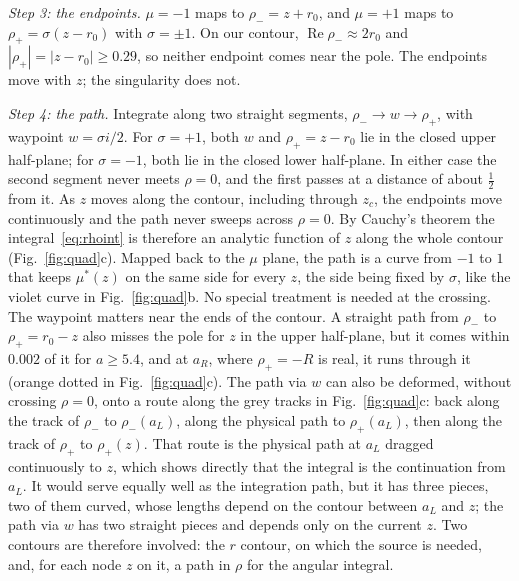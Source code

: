 \documentclass[aps,prd,twocolumn,superscriptaddress,nofootinbib,floatfix]{revtex4-2}
\renewcommand{\Re}{\operatorname{Re}}
\begin{document}
\emph{Step 3: the endpoints.}
$\mu=-1$ maps to $\rho_-=z+r_0$, and $\mu=+1$ maps to $\rho_+=\sigma(z-r_0)$ with $\sigma=\pm1$.
On our contour, $\Re\rho_-\approx2r_0$ and $|\rho_+|=|z-r_0|\ge0.29$, so neither endpoint comes near the pole.
The endpoints move with $z$; the singularity does not.

\emph{Step 4: the path.}
Integrate along two straight segments, $\rho_-\to w\to\rho_+$, with waypoint $w=\sigma i/2$.
For $\sigma=+1$, both $w$ and $\rho_+=z-r_0$ lie in the closed upper half-plane; for $\sigma=-1$, both lie in the closed lower half-plane.
In either case the second segment never meets $\rho=0$, and the first passes at a distance of about $\tfrac12$ from it.
As $z$ moves along the contour, including through $z_c$, the endpoints move continuously and the path never sweeps across $\rho=0$.
By Cauchy's theorem the integral~\eqref{eq:rhoint} is therefore an analytic function of $z$ along the whole contour (Fig.~\ref{fig:quad}c).
Mapped back to the $\mu$ plane, the path is a curve from $-1$ to $1$ that keeps $\mu^*(z)$ on the same side for every $z$, the side being fixed by $\sigma$, like the violet curve in Fig.~\ref{fig:quad}b.
No special treatment is needed at the crossing.
The waypoint matters near the ends of the contour.
A straight path from $\rho_-$ to $\rho_+=r_0-z$ also misses the pole for $z$ in the upper half-plane, but it comes within $0.002$ of it for $a\ge5.4$, and at $a_R$, where $\rho_+=-R$ is real, it runs through it (orange dotted in Fig.~\ref{fig:quad}c).
The path via $w$ can also be deformed, without crossing $\rho=0$, onto a route along the grey tracks in Fig.~\ref{fig:quad}c: back along the track of $\rho_-$ to $\rho_-(a_L)$, along the physical path to $\rho_+(a_L)$, then along the track of $\rho_+$ to $\rho_+(z)$.
That route is the physical path at $a_L$ dragged continuously to $z$, which shows directly that the integral is the continuation from $a_L$.
It would serve equally well as the integration path, but it has three pieces, two of them curved, whose lengths depend on the contour between $a_L$ and $z$; the path via $w$ has two straight pieces and depends only on the current $z$.
Two contours are therefore involved: the $r$ contour, on which the source is needed, and, for each node $z$ on it, a path in $\rho$ for the angular integral.
\end{document}
